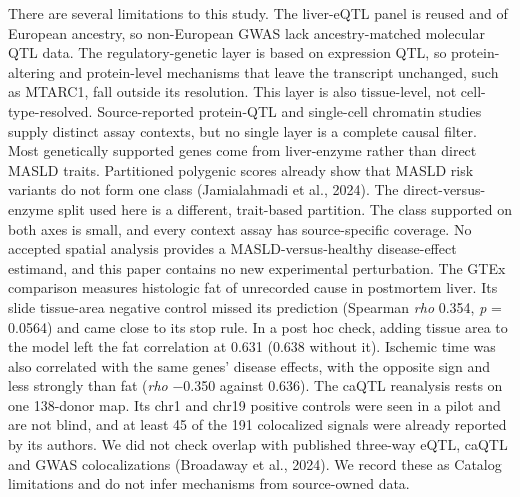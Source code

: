 There are several limitations to this study. The liver-eQTL panel is
reused and of European ancestry, so non-European GWAS lack ancestry-matched
molecular QTL data. The regulatory-genetic layer is based on expression QTL, so
protein-altering and protein-level mechanisms that leave the transcript
unchanged, such as MTARC1, fall outside its resolution. This layer is also
tissue-level, not cell-type-resolved. Source-reported protein-QTL and
single-cell chromatin studies supply distinct assay contexts, but no single
layer is a complete causal filter. Most genetically supported genes come from
liver-enzyme rather than direct MASLD traits. Partitioned polygenic scores
already show that MASLD risk variants do not form one class (Jamialahmadi et
al., 2024). The direct-versus-enzyme split used here is a different, trait-based
partition. The class supported on both axes is small, and every context assay
has source-specific coverage. No accepted spatial analysis provides a
MASLD-versus-healthy disease-effect estimand, and this paper contains no new
experimental perturbation. The GTEx comparison measures histologic fat of
unrecorded cause in postmortem liver. Its slide tissue-area negative control
missed its prediction (Spearman \emph{rho} 0.354, \emph{p} = 0.0564) and came close to its
stop rule. In a post hoc check, adding tissue area to the model left the fat
correlation at 0.631 (0.638 without it). Ischemic time was also correlated with the same genes' disease
effects, with the opposite sign and less strongly than fat (\emph{rho} −0.350 against
0.636). The caQTL reanalysis rests on one 138-donor map. Its chr1 and chr19
positive controls were seen in a pilot and are not blind, and at least 45 of the
191 colocalized signals were already reported by its authors. We did not check
overlap with published three-way eQTL, caQTL and GWAS colocalizations
(Broadaway et al., 2024). We record these as Catalog limitations and do not
infer mechanisms from source-owned data.

